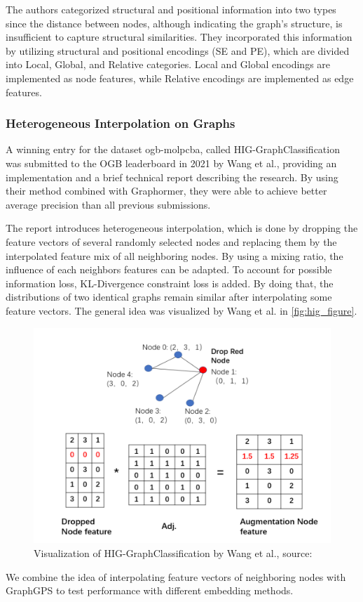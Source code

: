The authors categorized structural and positional information into two types since the distance between nodes, although indicating the graph's structure, is insufficient to capture structural similarities. They incorporated this information by utilizing structural and positional encodings (SE and PE), which are divided into Local, Global, and Relative categories. Local and Global encodings are implemented as node features, while Relative encodings are implemented as edge features.

\subsubsection{Heterogeneous Interpolation on Graphs}
A winning entry for the dataset ogb-molpcba, called HIG-GraphClassification~\cite{tencenc2021Hig,tencenc2021HigPaper} was submitted to the OGB leaderboard in 2021 by Wang et al., providing an implementation and a brief technical report describing the research. By using their method combined with Graphormer, they were able to achieve better average precision than all previous submissions.

The report introduces heterogeneous interpolation, which is done by dropping the feature vectors of several randomly selected nodes and replacing them by the interpolated feature mix of all neighboring nodes.
By using a mixing ratio, the influence of each neighbors features can be adapted. To account for possible information loss, KL-Divergence constraint loss is added. By doing that, the distributions of two identical graphs remain similar after interpolating some feature vectors. The general idea was visualized by Wang et al. in \autoref{fig:hig_figure}.

\begin{figure}[h!]
    \centering
    \includegraphics[scale=0.3]{tex/res/hig_figure.png}
    \caption{Visualization of HIG-GraphClassification by Wang et al., \tiny{source: \cite{tencenc2021HigPaper}}}
    \label{fig:hig_figure}
\end{figure}

We combine the idea of interpolating feature vectors of neighboring nodes with GraphGPS to test performance with different embedding methods.